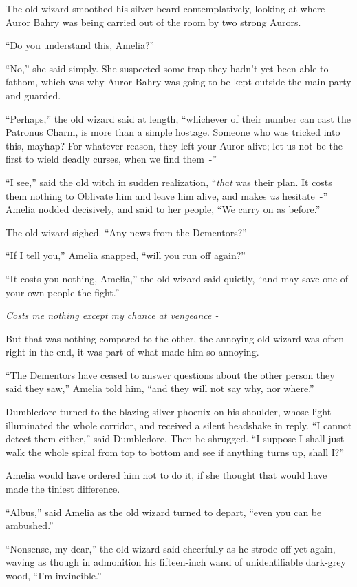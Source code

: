 The old wizard smoothed his silver beard contemplatively, looking at where Auror Bahry was being carried out of the room by two strong Aurors.

``Do you understand this, Amelia?''

``No,'' she said simply. She suspected some trap they hadn't yet been able to fathom, which was why Auror Bahry was going to be kept outside the main party and guarded.

``Perhaps,'' the old wizard said at length, ``whichever of their number can cast the Patronus Charm, is more than a simple hostage. Someone who was tricked into this, mayhap? For whatever reason, they left your Auror alive; let us not be the first to wield deadly curses, when we find them~-''

``I see,'' said the old witch in sudden realization, ``\emph{that} was their plan. It costs them nothing to Oblivate him and leave him alive, and makes \emph{us} hesitate~-'' Amelia nodded decisively, and said to her people, ``We carry on as before.''

The old wizard sighed. ``Any news from the Dementors?''

``If I tell you,'' Amelia snapped, ``will you run off again?''

``It costs you nothing, Amelia,'' the old wizard said quietly, ``and may save one of your own people the fight.''

\emph{Costs me nothing except my chance at vengeance -}

But that was nothing compared to the other, the annoying old wizard was often right in the end, it was part of what made him so annoying.

``The Dementors have ceased to answer questions about the other person they said they saw,'' Amelia told him, ``and they will not say why, nor where.''

Dumbledore turned to the blazing silver phoenix on his shoulder, whose light illuminated the whole corridor, and received a silent headshake in reply. ``I cannot detect them either,'' said Dumbledore. Then he shrugged. ``I suppose I shall just walk the whole spiral from top to bottom and see if anything turns up, shall I?''

Amelia would have ordered him not to do it, if she thought that would have made the tiniest difference.

``Albus,'' said Amelia as the old wizard turned to depart, ``even you can be ambushed.''

``Nonsense, my dear,'' the old wizard said cheerfully as he strode off yet again, waving as though in admonition his fifteen-inch wand of unidentifiable dark-grey wood, ``I'm invincible.''

